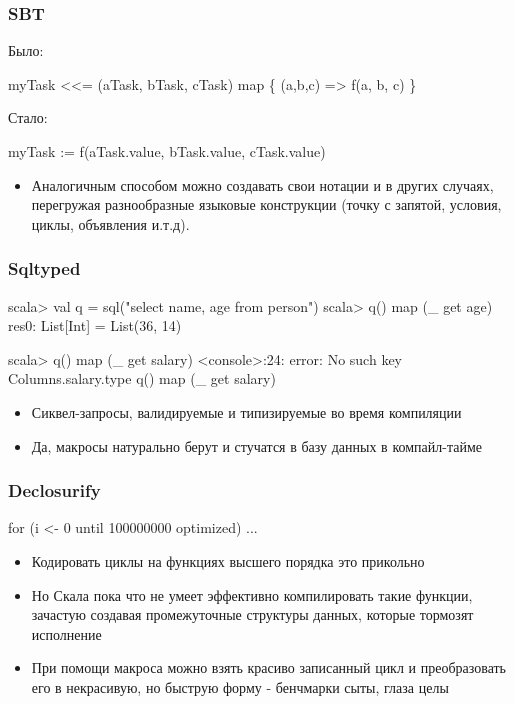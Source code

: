 \documentclass[svgnames,hyperref={bookmarks=false}]{beamer}
\begin{document}
\begin{frame}[fragile]
\frametitle{SBT}

Было:
\begin{semiverbatim}
myTask <<= (aTask, bTask, cTask) map \{ (a,b,c) =>
  f(a, b, c)
\}
\end{semiverbatim}

Стало:
\begin{semiverbatim}
myTask := f(aTask.value, bTask.value, cTask.value)
\end{semiverbatim}

\begin{itemize}
\item Аналогичным способом можно создавать свои нотации и в других случаях, перегружая
разнообразные языковые конструкции (точку с запятой, условия, циклы, объявления и.т.д).
\end{itemize}

\end{frame}

\begin{frame}[fragile]
\frametitle{Sqltyped}

\begin{semiverbatim}
scala> val q = sql("select name, age from person")
scala> q() map (_ get age)
res0: List[Int] = List(36, 14)

scala> q() map (_ get salary)
<console>:24: error: No such key Columns.salary.type
               q() map (_ get salary)
\end{semiverbatim}

\begin{itemize}
\item Сиквел-запросы, валидируемые и типизируемые во время компиляции
\item Да, макросы натурально берут и стучатся в базу данных в компайл-тайме
\end{itemize}
\end{frame}

\begin{frame}[fragile]
\frametitle{Declosurify}

\begin{semiverbatim}
for (i <- 0 until 100000000 optimized) { ... }
\end{semiverbatim}

\begin{itemize}
\item Кодировать циклы на функциях высшего порядка это прикольно
\item Но Скала пока что не умеет эффективно компилировать такие функции, зачастую создавая промежуточные структуры данных, которые тормозят исполнение
\item При помощи макроса можно взять красиво записанный цикл и преобразовать его в некрасивую, но быструю форму - бенчмарки сыты, глаза целы
\end{itemize}
\end{frame}
\end{document}
